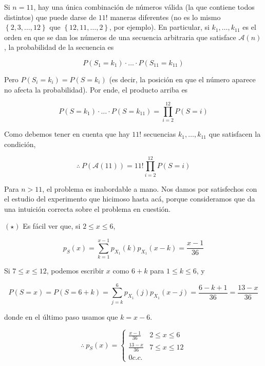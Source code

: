 \documentclass[a4paper, 12pt]{article}
\begin{document}
Si $n = 11$, hay una única combinación de números válida (la que contiene todos distintos) que puede darse de $11!$ maneras diferentes (no es lo mismo $\left\{
2, 3, \ldots, 12\right\} $ que $\left\{ 12, 11, \ldots, 2 \right\} $, por
ejemplo). En particular, si $k_1, \ldots, k_{11}$ es el orden en que se dan los
números de una secuencia arbitraria que satisface $\mathcal{A}(n)$, la
probabilidad de la secuencia es 

\begin{equation*}
  P(S_1 = k_1) \cdot \ldots \cdot P(S_{11} = k_{11})
\end{equation*}

Pero $P(S_i = k_i) = P(S = k_i)$ (es decir, la posición en que el número aparece
no afecta la probabilidad). Por ende, el producto arriba es 


\begin{equation*}
  P(S = k_1) \cdot \ldots \cdot P(S = k_{11}) = \prod_{i=2}^{12}P(S = i)
\end{equation*}

Como debemos tener en cuenta que hay $11!$ secuencias $k_1, \ldots, k_{11}$ que
satisfacen la condición, 

\begin{equation*}
  \therefore ~ P(\mathcal{A}(11)) = 11! \prod_{i=2}^{12}P(S = i)
\end{equation*}

Para $n > 11$, el problema es inabordable a mano. Nos damos por satisfechos con el
estudio del experimento que hicimoso hasta acá, porque consideramos que da una
intuición correcta sobre el problema en cuestión.

\pagebreak 

\begin{helpframe}
$(\star)$ Es fácil ver que, si $2 \leq x \leq 6$,

\begin{equation*}
  p_S(x) = \sum_{k=1}^{x-1} p_{X_1}(k)p_{X_1}(x - k) = \frac{x-1}{36}
\end{equation*}

Si $7 \leq x \leq 12$, podemos escribir $x$ como $6 + k$ para $1 \leq k \leq 6$,
y

\begin{equation*}
  P(S = x) = P(S = 6 + k) = \sum_{j=k}^{6} p_{X_1}(j)p_{X_1}(x - j) = \frac{6 -
  k + 1}{36} = \frac{13 - x}{36}
\end{equation*}

donde en el último paso usamos que $k = x - 6$. 

\begin{equation*}
  \therefore ~ p_S(x) = \begin{cases}
    \frac{x-1}{36} &2 \leq x \leq 6 \\ 
    \frac{13-x}{36} &7 \leq x \leq 12 \\ 
    0 c.c.
  \end{cases}
\end{equation*}
\end{helpframe}
\end{document}
